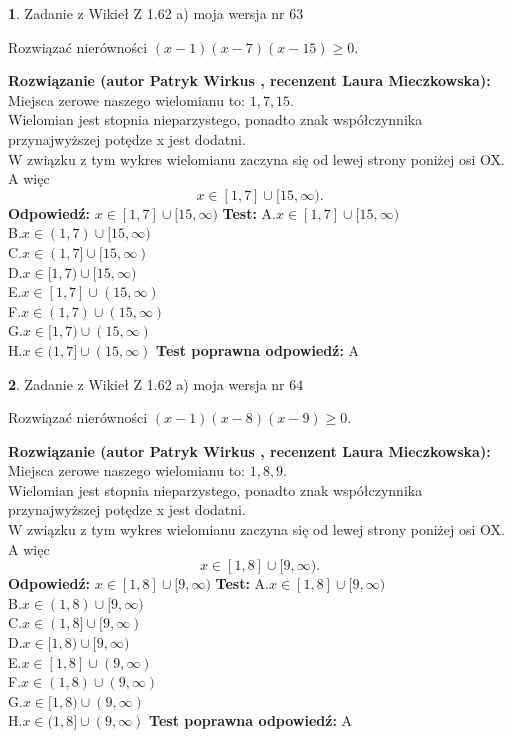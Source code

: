 \documentclass[12pt, a4paper]{article}
\theoremstyle{definition} %
\newtheorem{zad}{}
\newcommand{\zadStart}[1]{\begin{zad}#1\newline}
\newcommand{\zadStop}{\end{zad}}
\newcommand{\rozwStart}[2]{\noindent \textbf{Rozwiązanie (autor #1 , recenzent #2): }\newline}
\newcommand{\rozwStop}{\newline}
\newcommand{\odpStart}{\noindent \textbf{Odpowiedź:}\newline}
\newcommand{\odpStop}{\newline}
\newcommand{\testStart}{\noindent \textbf{Test:}\newline}
\newcommand{\testStop}{\newline}
\newcommand{\kluczStart}{\noindent \textbf{Test poprawna odpowiedź:}\newline}
\newcommand{\kluczStop}{\newline}
\begin{document}
\zadStart{Zadanie z Wikieł Z 1.62 a) moja wersja nr 63}

Rozwiązać nierówności $(x-1)(x-7)(x-15)\ge0$.
\zadStop
\rozwStart{Patryk Wirkus}{Laura Mieczkowska}
Miejsca zerowe naszego wielomianu to: $1, 7, 15$.\\
Wielomian jest stopnia nieparzystego, ponadto znak współczynnika przy\linebreak najwyższej potędze x jest dodatni.\\ W związku z tym wykres wielomianu zaczyna się od lewej strony poniżej osi OX. A więc $$x \in [1,7] \cup [15,\infty).$$
\rozwStop
\odpStart
$x \in [1,7] \cup [15,\infty)$
\odpStop
\testStart
A.$x \in [1,7] \cup [15,\infty)$\\
B.$x \in (1,7) \cup [15,\infty)$\\
C.$x \in (1,7] \cup [15,\infty)$\\
D.$x \in [1,7) \cup [15,\infty)$\\
E.$x \in [1,7] \cup (15,\infty)$\\
F.$x \in (1,7) \cup (15,\infty)$\\
G.$x \in [1,7) \cup (15,\infty)$\\
H.$x \in (1,7] \cup (15,\infty)$
\testStop
\kluczStart
A
\kluczStop



\zadStart{Zadanie z Wikieł Z 1.62 a) moja wersja nr 64}

Rozwiązać nierówności $(x-1)(x-8)(x-9)\ge0$.
\zadStop
\rozwStart{Patryk Wirkus}{Laura Mieczkowska}
Miejsca zerowe naszego wielomianu to: $1, 8, 9$.\\
Wielomian jest stopnia nieparzystego, ponadto znak współczynnika przy\linebreak najwyższej potędze x jest dodatni.\\ W związku z tym wykres wielomianu zaczyna się od lewej strony poniżej osi OX. A więc $$x \in [1,8] \cup [9,\infty).$$
\rozwStop
\odpStart
$x \in [1,8] \cup [9,\infty)$
\odpStop
\testStart
A.$x \in [1,8] \cup [9,\infty)$\\
B.$x \in (1,8) \cup [9,\infty)$\\
C.$x \in (1,8] \cup [9,\infty)$\\
D.$x \in [1,8) \cup [9,\infty)$\\
E.$x \in [1,8] \cup (9,\infty)$\\
F.$x \in (1,8) \cup (9,\infty)$\\
G.$x \in [1,8) \cup (9,\infty)$\\
H.$x \in (1,8] \cup (9,\infty)$
\testStop
\kluczStart
A
\kluczStop
\end{document}
